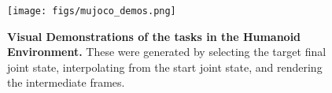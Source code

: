 \begin{figure} %
    \label{fig:mujoco_demos}
    \centering    
    \texttt{[image: figs/mujoco\_demos.png]}
    \caption{\small \textbf{Visual Demonstrations of the tasks in the Humanoid Environment.} These were generated by selecting the target final joint state, interpolating from the start joint state, and rendering the intermediate frames.}
    \label{fig:all_mujoco_demos}
\end{figure}